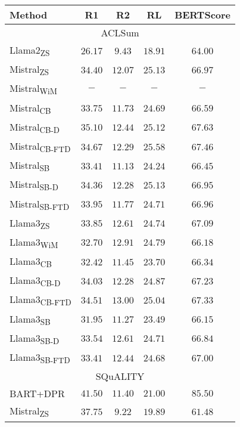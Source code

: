 
\begin{table*}%
    \def\arraystretch{1.2}
    \centering
    \scriptsize
    \begin{tabular}{l c c c c}
    \toprule %
    Method & R1 & R2 & RL & BERTScore\\

\midrule
\multicolumn{5}{c}{ACLSum \cite{DBLP:journals/corr/abs-2403-05303}}\\
\midrule
Llama2\textsubscript{ZS} \cite{DBLP:journals/corr/abs-2403-05303} & $26.17$&$9.43$&$18.91$&$64.00$ \\
Mistral\textsubscript{ZS}&$34.40$& $12.07$& $25.13$& $66.97$\\
Mistral\textsubscript{WiM}&$-$& $-$& $-$& $-$\\
Mistral\textsubscript{CB}&$33.75$& $11.73$& $24.69$& $66.59$\\
Mistral\textsubscript{CB-D}&$\mathbf{35.10}$& $12.44$& $25.12$& $\mathbf{67.63}$\\
Mistral\textsubscript{CB-FTD}&$34.67$& $12.29$& $\mathbf{25.58}$& $67.46$\\
Mistral\textsubscript{SB}&$33.41$& $11.13$& $24.24$& $66.45$\\
Mistral\textsubscript{SB-D}&$34.36$& $12.28$& $25.13$& $66.95$\\
Mistral\textsubscript{SB-FTD}&$33.95$& $11.77$& $24.71$& $66.96$\\
Llama3\textsubscript{ZS}&$33.85$& $12.61$& $24.74$& $67.09$\\
Llama3\textsubscript{WiM}&$32.70$& $12.91$& $24.79$& $66.18$\\
Llama3\textsubscript{CB}&$32.42$& $11.45$& $23.70$& $66.34$\\
Llama3\textsubscript{CB-D}&$34.03$& $12.28$& $24.87$& $67.23$\\
Llama3\textsubscript{CB-FTD}&$34.51$& $\mathbf{13.00}$& $25.04$& $67.33$\\
Llama3\textsubscript{SB}&$31.95$& $11.27$& $23.49$& $66.15$\\
Llama3\textsubscript{SB-D}&$33.54$& $12.61$& $24.71$& $66.84$\\
Llama3\textsubscript{SB-FTD}&$33.41$& $12.44$& $24.68$& $67.00$\\
\midrule
\multicolumn{5}{c}{SQuALITY \cite{DBLP:conf/emnlp/WangPCPB22}}\\
\midrule
BART+DPR \cite{DBLP:conf/emnlp/WangPCPB22} & $41.50$&$11.40$&$21.00$&$85.50$ \\
Mistral\textsubscript{ZS}&$\mathbf{37.75}$& $9.22$& $\mathbf{19.89}$& $\mathbf{61.48}$\\

\end{tabular}
\end{table*}
